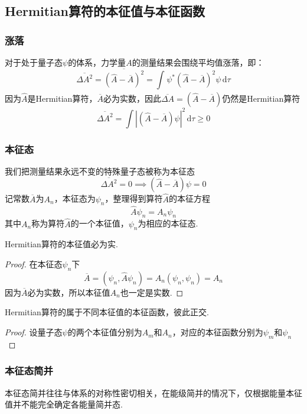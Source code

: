 \subsection{Hermitian算符的本征值与本征函数}

\subsubsection{涨落}
对于处于量子态$\psi$的体系，力学量$A$的测量结果会围绕平均值涨落，即：
$$
    \overline{\Delta A^2} = \overline{\left(\hat{A}-\overline{A}\right)^2}
    = \int_{}^{}\psi^*\left(\hat{A}-\overline{A}\right)^2\psi\,\mathrm{d}\tau
$$
因为$\hat{A}$是Hermitian算符，$\overline{A}$必为实数，因此$\overline{\Delta A}=\left(\hat{A}-\overline{A}\right)$仍然是Hermitian算符
$$
    \overline{\Delta A^2} = \int\left|\left(\hat{A}-\overline{A}\right)\psi\right|^2\,\mathrm{d}\tau \geqslant 0
$$

\subsubsection{本征态}
我们把测量结果永远不变的特殊量子态被称为本征态
$$
    \overline{\Delta A^2}=0 \implies \left(\hat{A}-\overline{A}\right)\psi = 0
$$
记常数$\overline{A}$为$A_n$，本征态为$\psi_n$，整理得到算符$\hat{A}$的本征方程
$$
    \hat{A}\psi_n = A_n\psi_n
$$
其中$A_n$称为算符$\hat{A}$的一个本征值，$\psi_n$为相应的本征态.




\begin{theorem}
    Hermitian算符的本征值必为实.
\end{theorem}
\begin{proof}
    在本征态$\psi_n$下
    $$
        \overline{A} = \left(\psi_n, \hat{A}\psi_n\right) = A_n(\psi_n,\psi_n) = A_n
    $$
    因为$\overline{A}$必为实数，所以本征值$A_n$也一定是实数.
\end{proof}




\begin{theorem}
    Hermitian算符的属于不同本征值的本征函数，彼此正交.
\end{theorem}
\begin{proof}
    设量子态$\psi$的两个本征值分别为$A_m$和$A_n$，对应的本征函数分别为$\psi_m$和$\psi_n$
\end{proof}


\subsubsection{本征态简并}
本征态简并往往与体系的对称性密切相关，在能级简并的情况下，仅根据能量本征值并不能完全确定各能量简并态.

